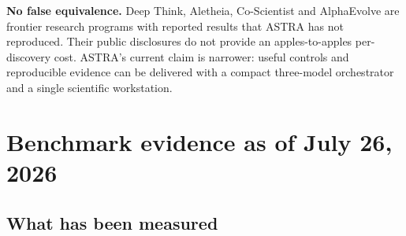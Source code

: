 \documentclass[10pt,a4paper]{article}
\begin{document}
\begin{riskbox}
\textbf{No false equivalence.} Deep Think, Aletheia, Co-Scientist and AlphaEvolve are
frontier research programs with reported results that ASTRA has not reproduced.
Their public disclosures do not provide an apples-to-apples per-discovery cost.
ASTRA's current claim is narrower: useful controls and reproducible evidence can be
delivered with a compact three-model orchestrator and a single scientific workstation.
\end{riskbox}

\newpage
\section*{Benchmark evidence as of July 26, 2026}

\subsection*{What has been measured}
\end{document}
